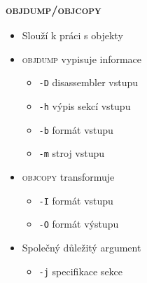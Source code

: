 \begin{frame}
  \frametitle{\textsc{objdump}/\textsc{objcopy}}

  \begin{itemize}
    \item Slouží k práci s objekty

    \pause

    \item \textsc{objdump} vypisuje informace
    \begin{itemize}
      \item \texttt{-D} disassembler vstupu
      \item \texttt{-h} výpis sekcí vstupu
      \item \texttt{-b} formát vstupu
      \item \texttt{-m} stroj vstupu
    \end{itemize}

    \pause

    \item \textsc{objcopy} transformuje
    \begin{itemize}
      \item \texttt{-I} formát vstupu
      \item \texttt{-O} formát výstupu
    \end{itemize}

    \pause

    \item Společný důležitý argument
    \begin{itemize}
      \item \texttt{-j} specifikace sekce
    \end{itemize}
  \end{itemize}

\end{frame}

